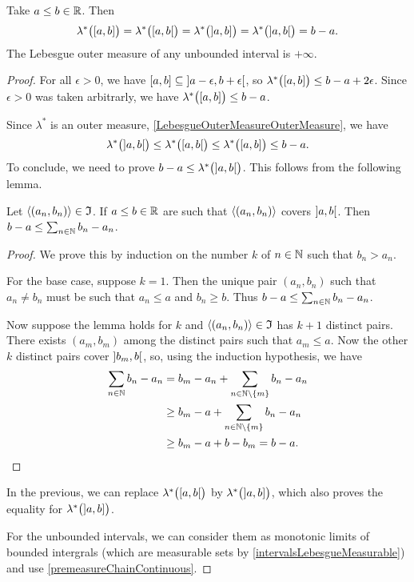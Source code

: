 \begin{lemma}
Take $a\leq b\in \mathbb{R}$. Then
\[ \lambda^*\big(\interval[c]{a,b}\big) = \lambda^*\big(\interval[co]{a,b}\big) = \lambda^*\big(\interval[oc]{a,b}\big) = \lambda^*\big(\interval[o]{a,b}\big) = b-a. \]
The Lebesgue outer measure of any unbounded interval is $+\infty$.
\end{lemma}
\begin{proof}
For all $\epsilon > 0$, we have $\interval{a,b} \subseteq \interval[o]{a-\epsilon, b+\epsilon}$, so $\lambda^*\big(\interval{a,b}\big)\leq b-a + 2\epsilon$. Since $\epsilon > 0$ was taken arbitrarly, we have $\lambda^*\big(\interval[c]{a,b}\big) \leq b-a$.

Since $\lambda^*$ is an outer measure, \ref{LebesgueOuterMeasureOuterMeasure}, we have
\[ \lambda^*\big(\interval[o]{a,b}\big) \leq \lambda^*\big(\interval[co]{a,b}\big) \leq \lambda^*\big(\interval[c]{a,b}\big) \leq b-a. \]
To conclude, we need to prove $b-a \leq \lambda^*\big(\interval[o]{a,b}\big)$. This follows from the following lemma.
\begin{lemma*}
Let $\left\langle (a_n, b_n) \right\rangle\in \mathfrak{I}$. If $a\leq b \in \mathbb{R}$ are such that $\left\langle (a_n, b_n) \right\rangle$ covers $\interval[o]{a,b}$. Then $b-a \leq \sum_{n\in\mathbb{N}}b_n - a_n$.
\end{lemma*}
\begin{proof}\renewcommand{\qedsymbol}{$\vdash$}
We prove this by induction on the number $k$ of $n\in\mathbb{N}$ such that $b_n > a_n$.

For the base case, suppose $k=1$. Then the unique pair $(a_n, b_n)$ such that $a_n\neq b_n$ must be such that $a_n \leq a$ and $b_n \geq b$. Thus $b-a \leq \sum_{n\in\mathbb{N}}b_n - a_n$.

Now suppose the lemma holds for $k$ and $\left\langle (a_n, b_n) \right\rangle\in \mathfrak{I}$ has $k+1$ distinct pairs. There exists $(a_m, b_m)$ among the distinct pairs such that $a_m\leq a$. Now the other $k$ distinct pairs cover $\interval[o]{b_m, b}$, so, using the induction hypothesis, we have
\begin{align*}
\sum_{n\in\mathbb{N}}b_n - a_n &= b_m - a_n + \sum_{n\in\mathbb{N}\setminus\{m\}}b_n - a_n \\
&\geq b_m - a + \sum_{n\in\mathbb{N}\setminus\{m\}}b_n - a_n \\
&\geq b_m - a + b - b_m = b-a.
\end{align*}
\end{proof}
In the previous, we can replace $\lambda^*\big(\interval[co]{a,b}\big)$ by $\lambda^*\big(\interval[oc]{a,b}\big)$, which also proves the equality for $\lambda^*\big(\interval[oc]{a,b}\big)$.

For the unbounded intervals, we can consider them as monotonic limits of bounded intergrals (which are measurable sets by \ref{intervalsLebesgueMeasurable}) and use \ref{premeasureChainContinuous}.
\end{proof}

